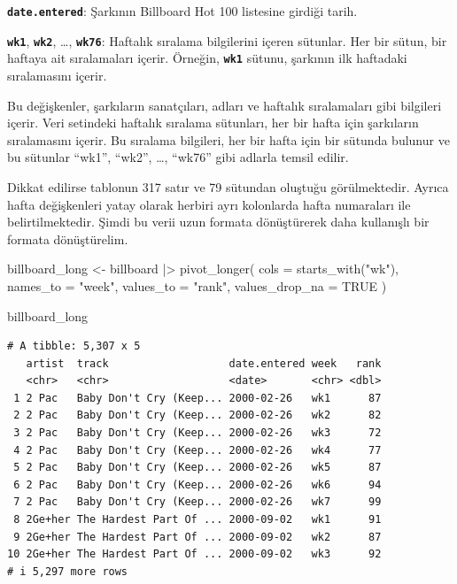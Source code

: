 \documentclass[
  letterpaper,
  DIV=11,
  numbers=noendperiod]{scrreprt}
\newenvironment{Shaded}{\begin{snugshade}}{\end{snugshade}}
\newcommand{\AttributeTok}[1]{\textcolor[rgb]{0.40,0.45,0.13}{#1}}
\newcommand{\ConstantTok}[1]{\textcolor[rgb]{0.56,0.35,0.01}{#1}}
\newcommand{\FunctionTok}[1]{\textcolor[rgb]{0.28,0.35,0.67}{#1}}
\newcommand{\NormalTok}[1]{\textcolor[rgb]{0.00,0.23,0.31}{#1}}
\newcommand{\OtherTok}[1]{\textcolor[rgb]{0.00,0.23,0.31}{#1}}
\newcommand{\SpecialCharTok}[1]{\textcolor[rgb]{0.37,0.37,0.37}{#1}}
\newcommand{\StringTok}[1]{\textcolor[rgb]{0.13,0.47,0.30}{#1}}
\begin{document}
\textbf{\texttt{date.entered}}: Şarkının Billboard Hot 100 listesine
girdiği tarih.

\textbf{\texttt{wk1}}, \textbf{\texttt{wk2}}, \ldots,
\textbf{\texttt{wk76}}: Haftalık sıralama bilgilerini içeren sütunlar.
Her bir sütun, bir haftaya ait sıralamaları içerir. Örneğin,
\textbf{\texttt{wk1}} sütunu, şarkının ilk haftadaki sıralamasını
içerir.

Bu değişkenler, şarkıların sanatçıları, adları ve haftalık sıralamaları
gibi bilgileri içerir. Veri setindeki haftalık sıralama sütunları, her
bir hafta için şarkıların sıralamasını içerir. Bu sıralama bilgileri,
her bir hafta için bir sütunda bulunur ve bu sütunlar ``wk1'', ``wk2'',
\ldots, ``wk76'' gibi adlarla temsil edilir.

Dikkat edilirse tablonun 317 satır ve 79 sütundan oluştuğu
görülmektedir. Ayrıca hafta değişkenleri yatay olarak herbiri ayrı
kolonlarda hafta numaraları ile belirtilmektedir. Şimdi bu verii uzun
formata dönüştürerek daha kullanışlı bir formata dönüştürelim.

\begin{Shaded}
\begin{Highlighting}[]
\NormalTok{billboard\_long }\OtherTok{\textless{}{-}}\NormalTok{ billboard }\SpecialCharTok{|\textgreater{}} 
  \FunctionTok{pivot\_longer}\NormalTok{(}
    \AttributeTok{cols =} \FunctionTok{starts\_with}\NormalTok{(}\StringTok{"wk"}\NormalTok{), }
    \AttributeTok{names\_to =} \StringTok{"week"}\NormalTok{, }
    \AttributeTok{values\_to =} \StringTok{"rank"}\NormalTok{,}
    \AttributeTok{values\_drop\_na =} \ConstantTok{TRUE}
\NormalTok{  )}

\NormalTok{billboard\_long}
\end{Highlighting}
\end{Shaded}

\begin{verbatim}
# A tibble: 5,307 x 5
   artist  track                   date.entered week   rank
   <chr>   <chr>                   <date>       <chr> <dbl>
 1 2 Pac   Baby Don't Cry (Keep... 2000-02-26   wk1      87
 2 2 Pac   Baby Don't Cry (Keep... 2000-02-26   wk2      82
 3 2 Pac   Baby Don't Cry (Keep... 2000-02-26   wk3      72
 4 2 Pac   Baby Don't Cry (Keep... 2000-02-26   wk4      77
 5 2 Pac   Baby Don't Cry (Keep... 2000-02-26   wk5      87
 6 2 Pac   Baby Don't Cry (Keep... 2000-02-26   wk6      94
 7 2 Pac   Baby Don't Cry (Keep... 2000-02-26   wk7      99
 8 2Ge+her The Hardest Part Of ... 2000-09-02   wk1      91
 9 2Ge+her The Hardest Part Of ... 2000-09-02   wk2      87
10 2Ge+her The Hardest Part Of ... 2000-09-02   wk3      92
# i 5,297 more rows
\end{verbatim}
\end{document}
